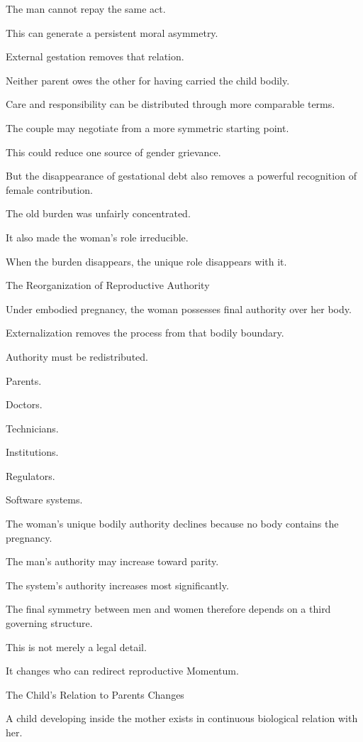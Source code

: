 The man cannot repay the same act.

This can generate a persistent moral asymmetry.

External gestation removes that relation.

Neither parent owes the other for having carried the child bodily.

Care and responsibility can be distributed through more comparable terms.

The couple may negotiate from a more symmetric starting point.

This could reduce one source of gender grievance.

But the disappearance of gestational debt also removes a powerful recognition of female contribution.

The old burden was unfairly concentrated.

It also made the woman’s role irreducible.

When the burden disappears, the unique role disappears with it.

The Reorganization of Reproductive Authority

Under embodied pregnancy, the woman possesses final authority over her body.

Externalization removes the process from that bodily boundary.

Authority must be redistributed.

Parents.

Doctors.

Technicians.

Institutions.

Regulators.

Software systems.

The woman’s unique bodily authority declines because no body contains the pregnancy.

The man’s authority may increase toward parity.

The system’s authority increases most significantly.

The final symmetry between men and women therefore depends on a third governing structure.

This is not merely a legal detail.

It changes who can redirect reproductive Momentum.

The Child’s Relation to Parents Changes

A child developing inside the mother exists in continuous biological relation with her.

